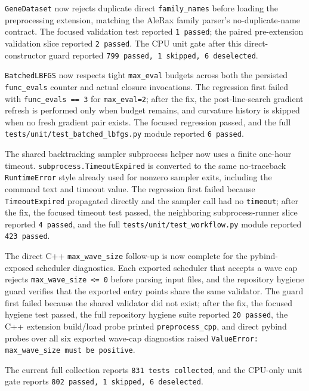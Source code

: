 \documentclass[11pt]{article}
\begin{document}
\texttt{GeneDataset} now rejects duplicate direct \texttt{family\_names} before
loading the preprocessing extension, matching the AleRax family parser's
no-duplicate-name contract.  The focused validation test reported
\texttt{1 passed}; the paired pre-extension validation slice reported
\texttt{2 passed}.  The CPU unit gate after this direct-constructor guard
reported \texttt{799 passed, 1 skipped, 6 deselected}.

\texttt{BatchedLBFGS} now respects tight \texttt{max\_eval} budgets across both
the persisted \texttt{func\_evals} counter and actual closure invocations.  The
regression first failed with \texttt{func\_evals == 3} for
\texttt{max\_eval=2}; after the fix, the post-line-search gradient refresh is
performed only when budget remains, and curvature history is skipped when no
fresh gradient pair exists.  The focused regression passed, and the full
\texttt{tests/unit/test\_batched\_lbfgs.py} module reported \texttt{6 passed}.

The shared backtracking sampler subprocess helper now uses a finite one-hour
timeout.  \texttt{subprocess.TimeoutExpired} is converted to the same
no-traceback \texttt{RuntimeError} style already used for nonzero sampler
exits, including the command text and timeout value.  The regression first
failed because \texttt{TimeoutExpired} propagated directly and the sampler call
had no \texttt{timeout}; after the fix, the focused timeout test passed, the
neighboring subprocess-runner slice reported \texttt{4 passed}, and the full
\texttt{tests/unit/test\_workflow.py} module reported \texttt{423 passed}.

The direct C++ \texttt{max\_wave\_size} follow-up is now complete for the
pybind-exposed scheduler diagnostics.  Each exported scheduler that accepts a
wave cap rejects \texttt{max\_wave\_size <= 0} before parsing input files, and
the repository hygiene guard verifies that the exported entry points share the
same validator.  The guard first failed because the shared validator did not
exist; after the fix, the focused hygiene test passed, the full repository
hygiene suite reported \texttt{20 passed}, the C++ extension build/load probe
printed \texttt{preprocess\_cpp}, and direct pybind probes over all six exported
wave-cap diagnostics raised \texttt{ValueError: max\_wave\_size must be
positive}.

The current full collection reports \texttt{831 tests collected}, and the
CPU-only unit gate reports \texttt{802 passed, 1 skipped, 6 deselected}.
\end{document}
